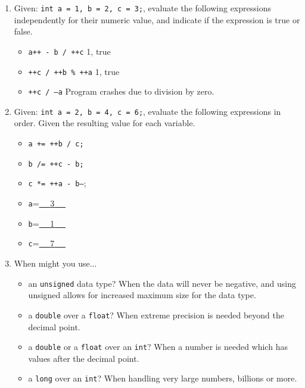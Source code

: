 \documentclass[letter,11pt]{article}
\begin{document}
\begin{enumerate}
    \item Given: \texttt{int a = 1, b = 2, c = 3;}, evaluate the following expressions independently for their numeric value, and indicate if the expression is true or false.
    \begin{itemize}
        \item \texttt{a++ - b / ++c} {\color{red}1, true}
        \item \texttt{++c / ++b \% ++a} {\color{red}1, true}
        \item \texttt{++c / --a} {\color{red}Program crashes due to division by zero.}
    \end{itemize}
    
    \item Given: \texttt{int a = 2, b = 4, c = 6;}, evaluate the following expressions in order. Given the resulting value for each variable.
    \begin{itemize}
        \item \texttt{a += ++b / c;}
        \item \texttt{b /= ++c - b;}
        \item \texttt{c *= ++a - b--};
        \item \texttt{a}=\underline{~~ {\color{red}3} ~~}
        \item \texttt{b}=\underline{~~ {\color{red}1} ~~}
        \item \texttt{c}=\underline{~~ {\color{red}7} ~~}
    \end{itemize}
    
    \item When might you use...
    \begin{itemize}
        \item an \texttt{unsigned} data type? {\color{red}When the data will never be negative, and using unsigned allows for increased maximum size for the data type.}
        \item a \texttt{double} over a \texttt{float}? {\color{red}When extreme precision is needed beyond the decimal point.}
        \item a \texttt{double} or a \texttt{float} over an \texttt{int}? {\color{red}When a number is needed which has values after the decimal point.}
        \item a \texttt{long} over an \texttt{int}? {\color{red}When handling very large numbers, billions or more.}
    \end{itemize}
    

\end{enumerate}
\end{document}
